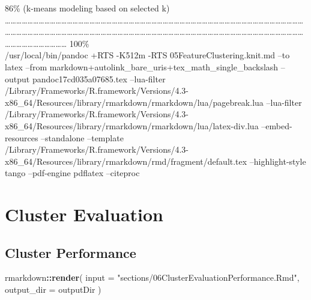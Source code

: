 \documentclass[
]{article}
\newenvironment{Shaded}{\begin{snugshade}}{\end{snugshade}}
\newcommand{\AttributeTok}[1]{\textcolor[rgb]{0.13,0.29,0.53}{#1}}
\newcommand{\FunctionTok}[1]{\textcolor[rgb]{0.13,0.29,0.53}{\textbf{#1}}}
\newcommand{\NormalTok}[1]{#1}
\newcommand{\SpecialCharTok}[1]{\textcolor[rgb]{0.81,0.36,0.00}{\textbf{#1}}}
\newcommand{\StringTok}[1]{\textcolor[rgb]{0.31,0.60,0.02}{#1}}
\begin{document}
\textbar{} 86\% (k-means modeling based on selected k) \textbar{}
\textbar\ldots\ldots\ldots\ldots\ldots\ldots\ldots\ldots\ldots\ldots\ldots\ldots\ldots\ldots\ldots\ldots\ldots\ldots\ldots\ldots\ldots\ldots\ldots\ldots\ldots\ldots\ldots\ldots\ldots\ldots\ldots\ldots\ldots\ldots\ldots\ldots\ldots\ldots\ldots\ldots\ldots\ldots\ldots\ldots\ldots\ldots\ldots\ldots\ldots\ldots\ldots\ldots\ldots\ldots\ldots\ldots\ldots\ldots\ldots\ldots\ldots\ldots\ldots\ldots\ldots\ldots\ldots\ldots\ldots\ldots\ldots\ldots\ldots\ldots\ldots\ldots\ldots\ldots\ldots\ldots\ldots\ldots\ldots\ldots\ldots\ldots\ldots\ldots\ldots\ldots\ldots\ldots\ldots\ldots\ldots\ldots\ldots\ldots\ldots\ldots\ldots\ldots\ldots\ldots\ldots\ldots\ldots\ldots\ldots\ldots\ldots\ldots\ldots\ldots\ldots\ldots\ldots\textbar{}
100\%\\
/usr/local/bin/pandoc +RTS -K512m -RTS 05FeatureClustering.knit.md --to
latex --from markdown+autolink\_bare\_uris+tex\_math\_single\_backslash
--output pandoc17cd035a07685.tex --lua-filter
/Library/Frameworks/R.framework/Versions/4.3-x86\_64/Resources/library/rmarkdown/rmarkdown/lua/pagebreak.lua
--lua-filter
/Library/Frameworks/R.framework/Versions/4.3-x86\_64/Resources/library/rmarkdown/rmarkdown/lua/latex-div.lua
--embed-resources --standalone --template
/Library/Frameworks/R.framework/Versions/4.3-x86\_64/Resources/library/rmarkdown/rmd/fragment/default.tex
--highlight-style tango --pdf-engine pdflatex --citeproc

\hypertarget{cluster-evaluation}{%
\section{Cluster Evaluation}\label{cluster-evaluation}}

\hypertarget{cluster-performance}{%
\subsection{Cluster Performance}\label{cluster-performance}}

\begin{Shaded}
\begin{Highlighting}[]
\NormalTok{rmarkdown}\SpecialCharTok{::}\FunctionTok{render}\NormalTok{(}
  \AttributeTok{input =} \StringTok{"sections/06ClusterEvaluationPerformance.Rmd"}\NormalTok{,}
  \AttributeTok{output\_dir =}\NormalTok{ outputDir}
\NormalTok{)}
\end{Highlighting}
\end{Shaded}
\end{document}
